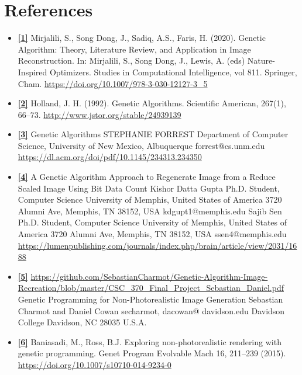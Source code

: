 \documentclass[10pt, conference]{IEEEtran}
\begin{document}
\section{References}
\begin{itemize}
    \item \textbf{\hyperref[sec:1]{[1]\label{sec:1r}}} Mirjalili, S., Song Dong, J., Sadiq, A.S., Faris, H. (2020). Genetic Algorithm: Theory, Literature Review, and Application in Image Reconstruction. In: Mirjalili, S., Song Dong, J., Lewis, A. (eds) Nature-Inspired Optimizers. Studies in Computational Intelligence, vol 811. Springer, Cham. 
    \url{https://doi.org/10.1007/978-3-030-12127-3_5}
    
    \item \textbf{\hyperref[sec:2]{[2]\label{sec:2r}}} Holland, J. H. (1992). Genetic Algorithms. Scientific American, 267(1), 66–73. \url{http://www.jstor.org/stable/24939139}
    \item \textbf{\hyperref[sec:3]{[3]\label{sec:3r}}} Genetic Algorithms
 STEPHANIE FORREST
 Department of Computer Science, University of New Mexico, Albuquerque forrest@cs.unm.edu 
 \url{https://dl.acm.org/doi/pdf/10.1145/234313.234350}
    \item \textbf{\hyperref[sec:4]{[4]\label{sec:4r}}} A Genetic Algorithm Approach to Regenerate Image from a Reduce Scaled Image Using Bit Data Count Kishor Datta Gupta Ph.D. Student, Computer Science University of Memphis, United States of America 3720 Alumni Ave, Memphis, TN 38152, USA kdgupt1@memphis.edu Sajib Sen Ph.D. Student, Computer Science University of Memphis, United States of America 3720 Alumni Ave, Memphis, TN 38152, USA ssen4@memphis.edu \url{https://lumenpublishing.com/journals/index.php/brain/article/view/2031/1688}
    
    \item \textbf{\hyperref[sec:5]{[5]\label{sec:5r}}} \url{https://github.com/SebastianCharmot/Genetic-Algorithm-Image-Recreation/blob/master/CSC_370_Final_Project_Sebastian_Daniel.pdf}
    Genetic Programming for Non-Photorealistic Image Generation
  Sebastian Charmot and Daniel Cowan 
secharmot,
dacowan@
davidson.edu
 Davidson College
 Davidson, NC 28035
 U.S.A.
 
    \item \textbf{\hyperref[sec:6]{[6]\label{sec:6r}}} Baniasadi, M., Ross, B.J. Exploring non-photorealistic rendering with genetic programming. Genet Program Evolvable Mach 16, 211–239 (2015). \url{https://doi.org/10.1007/s10710-014-9234-0}
\end{itemize}
\end{document}
